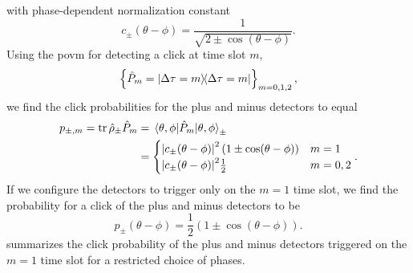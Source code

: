 with phase-dependent normalization constant
\begin{equation}
	c_\pm(\theta-\phi)
	=
	\frac{1}{\sqrt{2\pm\cos(\theta-\phi)}}
	.
\end{equation}
Using the \gls{povm} for detecting a click at time slot $m$,
\begin{equation}
	\left\{
		\hat{P}_m
		=
		\ketbra{\Delta\tau=m}
	\right\}_{m=0,1,2}
	,
\end{equation}
we find the click probabilities for the plus and minus detectors to equal
\begin{equation}
	\begin{split}
		p_{\pm,m}
		=
		\trace{\hat\rho_\pm\hat{P}_m}
		&=
		\expval{\hat{P}_m}{\theta,\phi}_{\pm}
		\\
		&=
		\begin{cases}
			\abs{c_\pm(\theta-\phi)}^2\left(1\pm\cos(\theta-\phi)\right) & m=1 \\
			\abs{c_\pm(\theta-\phi)}^2\frac{1}{2} & m=0,2
		\end{cases}
		.
	\end{split}
\end{equation}
If we configure the detectors to trigger only on the $m=1$ time slot, we find the probability for a click of the plus and minus detectors to be
\begin{equation}
	p_\pm(\theta-\phi)
	=
	\frac{1}{2}
	\left(1\pm\cos(\theta-\phi)\right)
	.
\end{equation}
 summarizes the click probability of the plus and minus detectors triggered on the $m=1$ time slot for a restricted choice of phases.
